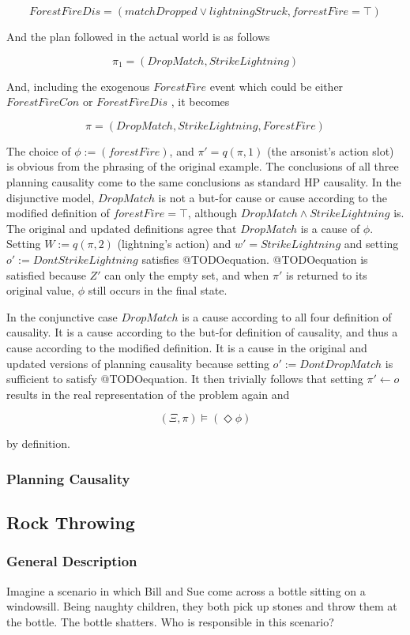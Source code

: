 \documentclass{article}
\theoremstyle{plain}
\theoremstyle{definition}
\begin{document}
\[
ForestFireDis = ( matchDropped \lor lightningStruck, forrestFire = \top )
\]

And the plan followed in the actual world is as follows

\[
\pi_1 = (DropMatch, StrikeLightning)
\]

And, including the exogenous $ForestFire$ event which could be either $ForestFireCon$ or $ForestFireDis$ , it becomes

\[
\pi = (DropMatch, StrikeLightning, ForestFire)
\]

The choice of $\phi:=(forestFire)$, and $\pi'=q(\pi,1)$ (the arsonist's action slot) is obvious from the phrasing of the original example. The conclusions of all three planning causality come to the same conclusions as standard HP causality. In the disjunctive model, $DropMatch$ is not a but-for cause or cause according to the modified definition of $forestFire=\top$, although $DropMatch \land StrikeLightning$ is. The original and updated definitions agree that $DropMatch$ is a cause of $\phi$. Setting $W:= q(\pi,2)$ (lightning's action) and $w'=StrikeLightning$ and setting $o':= DontStrikeLightning$ satisfies @TODOequation. @TODOequation is satisfied because $Z'$ can only the empty set, and when $\pi'$ is returned to its original value, $\phi$ still occurs in the final state.

In the conjunctive case $DropMatch$ is a cause according to all four definition of causality. It is a cause according to the but-for definition of causality, and thus a cause according to the modified definition. It is a cause in the original and updated versions of planning causality because setting $o':= DontDropMatch$ is sufficient to satisfy @TODOequation. It then trivially follows that setting $\pi' \leftarrow o$ results in the real representation of the problem again and

\[
(\Xi, \pi) \models (\Diamond \phi)
\]

by definition.

\subsubsection*{Planning Causality}


\subsection{Rock Throwing}
\subsubsection*{General Description}
Imagine a scenario in which Bill and Sue come across a bottle sitting on a windowsill. Being naughty children, they both pick up stones and throw them at the bottle. The bottle shatters. Who is responsible in this scenario?
\end{document}
